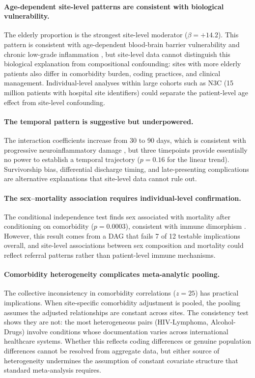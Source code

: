 \documentclass{article}
\begin{document}
\paragraph{Age-dependent site-level patterns are consistent with biological vulnerability.}
The elderly proportion is the strongest site-level moderator ($\beta = +14.2$).
This pattern is consistent with age-dependent blood-brain barrier vulnerability \cite{montagne2015bbb} and chronic low-grade inflammation \cite{franceschi2018inflammaging}, but site-level data cannot distinguish this biological explanation from compositional confounding: sites with more elderly patients also differ in comorbidity burden, coding practices, and clinical management.
Individual-level analyses within large cohorts such as N3C (15 million patients with hospital site identifiers) could separate the patient-level age effect from site-level confounding.

\paragraph{The temporal pattern is suggestive but underpowered.}
The interaction coefficients increase from 30 to 90 days, which is consistent with progressive neuroinflammatory damage \cite{douaud2022brain, nalbandian2021pasc}, but three timepoints provide essentially no power to establish a temporal trajectory ($p = 0.16$ for the linear trend).
Survivorship bias, differential discharge timing, and late-presenting complications are alternative explanations that site-level data cannot rule out.

\paragraph{The sex--mortality association requires individual-level confirmation.}
The conditional independence test finds sex associated with mortality after conditioning on comorbidity ($p = 0.0003$), consistent with immune dimorphism \cite{takahashi2020sex}.
However, this result comes from a DAG that fails 7 of 12 testable implications overall, and site-level associations between sex composition and mortality could reflect referral patterns rather than patient-level immune mechanisms.

\paragraph{Comorbidity heterogeneity complicates meta-analytic pooling.}
The collective inconsistency in comorbidity correlations ($z = 25$) has practical implications.
When site-specific comorbidity adjustment is pooled, the pooling assumes the adjusted relationships are constant across sites.
The consistency test shows they are not: the most heterogeneous pairs (HIV-Lymphoma, Alcohol-Drugs) involve conditions whose documentation varies across international healthcare systems.
Whether this reflects coding differences or genuine population differences cannot be resolved from aggregate data, but either source of heterogeneity undermines the assumption of constant covariate structure that standard meta-analysis requires.
\end{document}
